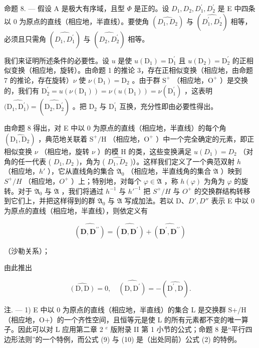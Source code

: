 命题 8. --- 假设 A 是极大有序域，且型 \(\Phi\) 是正的。设 \(D_{1}, D_{2}, D_{1}^{\prime}, D_{2}^{\prime}\) 是 E 中四条以 0 为原点的直线（相应地，半直线）。要使角 \((\widehat{D_{1}, D_{2}})\) 与 \((\widehat{D_{1}^{\prime}, D_{2}^{\prime}})\) 相等，必须且只需角 \((\widehat{D_{1}, D_{1}^{\prime}})\) 与 \((\widehat{D_{2}, D_{2}^{\prime}})\) 相等。

我们来证明所述条件的必要性。设 \(u\) 是使 \(u(\mathrm{D}_{1}) = \mathrm{D}_{1}^{\prime}\) 且 \(u(\mathrm{D}_{2}) = \mathrm{D}_{2}^{\prime}\) 的正相似变换（相应地，旋转）。由命题 1 的推论 3，存在正相似变换（相应地，由命题 7 的推论，存在旋转）\(\nu\) 使 \(\nu(\mathrm{D}_{1}) = \mathrm{D}_{2}\) 。由于群 \(\mathrm{S}^{+}\) （相应地，\(\mathrm{O}^{+}\) ）是交换的，我们有 \(\mathrm{D}_{2}^{\prime} = u(\nu(\mathrm{D}_{1})) = \nu(u(\mathrm{D}_{1})) = \nu(\mathrm{D}_{1}^{\prime})\) ，这表明 \((\widehat{\mathrm{D}_{1}, \mathrm{D}_{1}^{\prime})} = (\widehat{\mathrm{D}_{2}, \mathrm{D}_{2}^{\prime}})\) 。把 \(\mathrm{D}_{2}\) 与 \(\mathrm{D}_{1}^{\prime}\) 互换，充分性即由必要性得出。

由命题 8 得出，对 E 中以 0 为原点的直线（相应地，半直线）的每个角 \((\widehat{\mathrm{D}_1,\mathrm{D}_2})\) ，典范地关联着 \(\mathrm{S}^{+}/\mathrm{H}\) （相应地，\(\mathrm{O}^{+}\) ）中一个完全确定的元素，即正相似变换 \(\nu\) （相应地，旋转 \(\nu\) ）的模 H 的类，这些变换满足 \(u(D_1) = D_2\) （对角的任一代表 ( \(D_1, D_2\) )，角为 ( \(\widehat{D_1, D_2}\) )）。这样我们定义了一个典范双射 \(h\) （相应地，\(h'\) ），它从直线角的集合 \(\mathfrak{A}_0\) （相应地，半直线角的集合 \(\mathfrak{A}\) ）映到 \(S^+/H\) （相应地，\(O^+\) ）上；特别地，对每个 \(\varphi \in \mathfrak{A}\) ，称 \(h(\varphi)\) 为角为 \(\varphi\) 的旋转。对于 \(\mathfrak{A}_0\) 与 \(\mathfrak{A}\) ，我们将通过 \(h^{-1}\) 与 \(h'^{-1}\) 把 \(S^+/H\) 与 \(O^+\) 的交换群结构转移到它们上，并把这样得到的群 \(\mathfrak{A}_0\) 与 \(\mathfrak{A}\) 写成加法。若以 D、\(D', D''\) 表示 E 中以 0 为原点的直线（相应地，半直线），则依定义有

\[
\widehat {(\mathbf {D} , \mathbf {D} ^ {\prime \prime})} = \widehat {(\mathbf {D} , \mathbf {D} ^ {\prime})} + \widehat {(\mathbf {D} ^ {\prime} , \mathbf {D} ^ {\prime \prime})}\tag{9}
\]

（沙勒关系）；

由此推出

\[
\widehat {(\mathrm{D} , \mathrm{D})} = 0, \quad \widehat {(\mathrm{D} , \mathrm{D} ^ {\prime})} = - (\widehat {\mathrm{D} ^ {\prime} , \mathrm{D}}).\tag{10}
\]

注. --- 1) E 中以 0 为原点的直线（相应地，半直线）的集合 L 是交换群 S+/H（相应地，O+）的一个齐性空间，且恒等元是使 L 的所有元素都不变的唯一算子。因此可以对 L 应用第二章 2 \(^{e}\) 版附录 II 第 1 小节的公式；命题 8 是“平行四边形法则”的一个特例，而公式 (9) 与 (10) 是（出处同前）公式 (2) 的特例。

